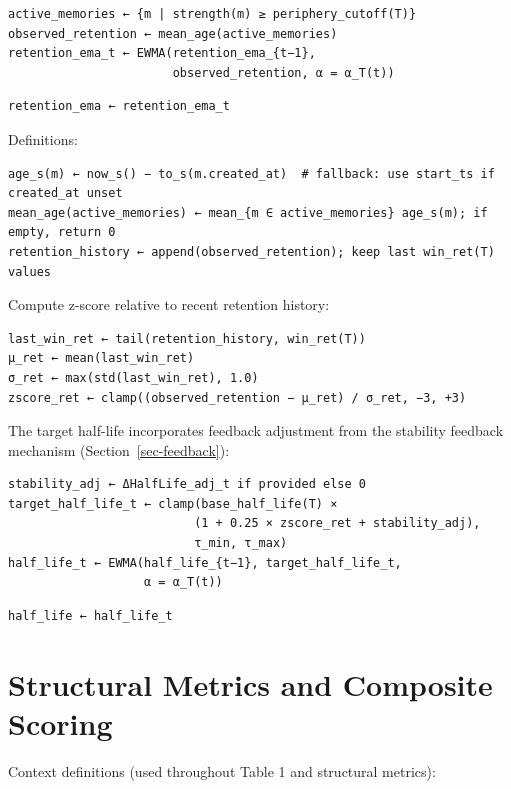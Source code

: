 \documentclass[
  letterpaper,
  DIV=11,
  numbers=noendperiod]{scrartcl}
\begin{document}
\begin{verbatim}
active_memories ← {m | strength(m) ≥ periphery_cutoff(T)}
observed_retention ← mean_age(active_memories)
retention_ema_t ← EWMA(retention_ema_{t−1},
                       observed_retention, α = α_T(t))
\end{verbatim}

\begin{verbatim}
retention_ema ← retention_ema_t
\end{verbatim}

Definitions:

\begin{verbatim}
age_s(m) ← now_s() − to_s(m.created_at)  # fallback: use start_ts if created_at unset
mean_age(active_memories) ← mean_{m ∈ active_memories} age_s(m); if empty, return 0
retention_history ← append(observed_retention); keep last win_ret(T) values
\end{verbatim}

Compute z-score relative to recent retention history:

\begin{verbatim}
last_win_ret ← tail(retention_history, win_ret(T))
μ_ret ← mean(last_win_ret)
σ_ret ← max(std(last_win_ret), 1.0)
zscore_ret ← clamp((observed_retention − μ_ret) / σ_ret, −3, +3)
\end{verbatim}

The target half-life incorporates feedback adjustment from the stability
feedback mechanism (Section~\ref{sec-feedback}):

\begin{verbatim}
stability_adj ← ΔHalfLife_adj_t if provided else 0
target_half_life_t ← clamp(base_half_life(T) ×
                          (1 + 0.25 × zscore_ret + stability_adj),
                          τ_min, τ_max)
half_life_t ← EWMA(half_life_{t−1}, target_half_life_t,
                   α = α_T(t))
\end{verbatim}

\begin{verbatim}
half_life ← half_life_t
\end{verbatim}

\section{Structural Metrics and Composite
Scoring}\label{sec-structural-metrics}

Context definitions (used throughout Table 1 and structural metrics):
\end{document}
